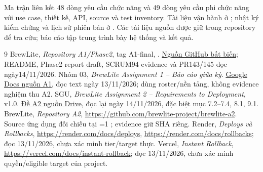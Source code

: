 \documentclass[12pt,a4paper]{article}
\DeclareRobustCommand{\texttt}[1]{%
  \ifnum\pdfmatch{^[ -~]*$}{\detokenize{#1}}=1\relax
    \BrewLiteOriginalTexttt{\seqsplit{#1}}%
  \else
    \BrewLiteOriginalTexttt{#1}%
  \fi}
\begin{document}
Ma trận  liên kết 48 dòng yêu cầu chức năng và
49 dòng yêu cầu phi chức năng với use case, thiết kế, API, source và test inventory.
Tài liệu vận hành ở ; nhật ký kiểm chứng và lịch sử
phiên bản ở . Các tài liệu nguồn được
giữ trong repository để tra cứu; báo cáo tập trung trình bày hệ thống và kết quả.
\clearpage

\clearpage
\begin{thebibliography}{9}
 BrewLite, \emph{Repository A1/Phase2}, tag A1-final,
.
\href{https://github.com/brewlite-project/brewlite/tree/1951dc124c83359556f04adb6ba3f0ee9f22fce4}{Nguồn GitHub bất biến};
README, Phase2 report draft, SCRUM94 evidence và PR143/145 đọc ngày14/11/2026.
 Nhóm 03, \emph{BrewLite Assignment 1 -- Báo cáo giữa kỳ}.
\href{https://docs.google.com/document/d/1A43E5hJ4HEl6do7-Z0BYhmbKJVVgQsMdBOhCl7INyoY/edit}{Google Docs nguồn A1},
đọc text ngày 13/11/2026; dùng roster/nền tảng, không evidence nghiệm thu A2.
 SGU, \emph{BrewLite Assignment 2 -- Requirements to Deployment}, v1.0.
\href{https://drive.google.com/file/d/1CYVsexpTXZ6Uyg2FHMRE8lnJHSPkYQmi/view}{Đề A2 nguồn Drive},
đọc lại ngày 14/11/2026, đặc biệt mục 7.2--7.4, 8.1, 9.1.
 BrewLite, \emph{Repository A2},
\url{https://github.com/brewlite-project/brewlite-a2}.
Source ứng dụng đối chiếu tại \texttt{dev/0e43bcb}; evidence giữ SHA riêng.
 Render, \emph{Deploys và Rollbacks},
\url{https://render.com/docs/deploys},
\url{https://render.com/docs/rollbacks}; đọc 13/11/2026, chưa xác minh tier/target thực.
 Vercel, \emph{Instant Rollback},
\url{https://vercel.com/docs/instant-rollback}; đọc 13/11/2026,
chưa xác minh quyền/eligible target của project.
\end{thebibliography}
\end{document}
